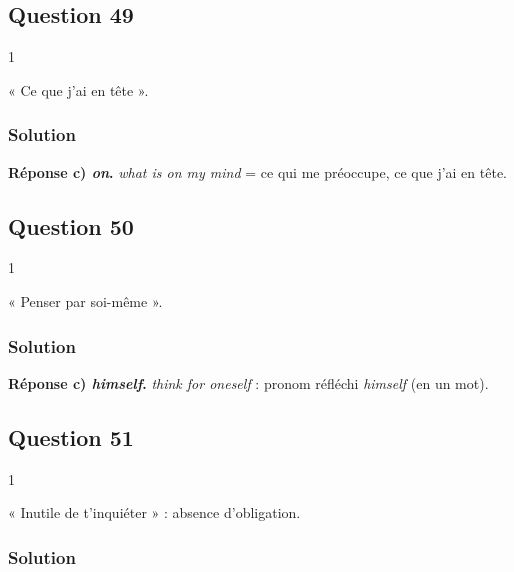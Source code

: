 \documentclass[11pt,a4paper]{article}
\begin{document}
\hypertarget{question-49}{%
\subsection{Question 49}\label{question-49}}

\begin{indication}{1}

« Ce que j'ai en tête ».

\end{indication}

\hypertarget{solution-48}{%
\subsubsection{Solution}\label{solution-48}}

\textbf{Réponse c) \emph{on}.} \emph{what is on my mind} = ce qui me préoccupe, ce que j'ai en tête.

\hypertarget{question-50}{%
\subsection{Question 50}\label{question-50}}

\begin{indication}{1}

« Penser par soi-même ».

\end{indication}

\hypertarget{solution-49}{%
\subsubsection{Solution}\label{solution-49}}

\textbf{Réponse c) \emph{himself}.} \emph{think for oneself} : pronom réfléchi \emph{himself} (en un mot).

\hypertarget{question-51}{%
\subsection{Question 51}\label{question-51}}

\begin{indication}{1}

« Inutile de t'inquiéter » : absence d'obligation.

\end{indication}

\hypertarget{solution-50}{%
\subsubsection{Solution}\label{solution-50}}
\end{document}
